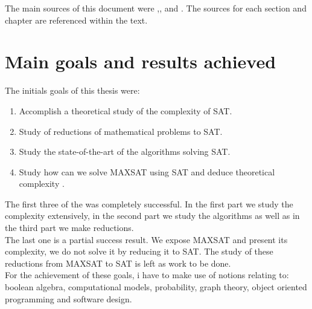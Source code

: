 The main sources of this document were \cite{schoning2013satisfiability},\cite{marek2009introduction},\cite{arora2009computational} and \cite{imms-sat18}. The sources for each section and chapter are referenced within the text.

\section*{Main goals and results achieved}
The initials goals of this thesis were:
\begin{enumerate}
\item Accomplish a theoretical study of the complexity of SAT.
\item Study of reductions of mathematical problems to SAT.
\item Study the state-of-the-art of the algorithms solving SAT.
\item Study how can we solve MAXSAT using SAT and deduce theoretical complexity .
\end{enumerate}

The first three of the was completely successful. In the first part we study the complexity extensively, in the second part we study the algorithms as well as in the third part we make reductions. \\

The last one is a partial success result. We expose MAXSAT and present its complexity, we do not solve it by reducing it to SAT. The study of these reductions from MAXSAT to SAT is left as work to be done.\\

For the achievement of these goals, i have to make use of notions relating to: boolean algebra, computational models, probability,  graph theory, object oriented programming and software design.



\endinput
